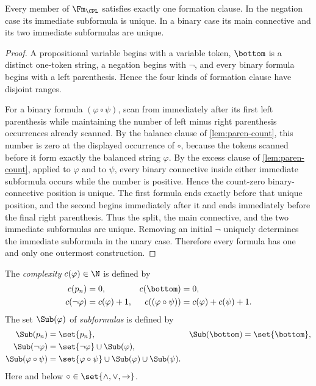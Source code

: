 \begin{theorem}
\label{thm:prop-unique-readability}
Every member of \(\Fm_{\CPL}\) satisfies exactly one formation clause.  In
the negation case its immediate subformula is unique.  In a binary case its
main connective and its two immediate subformulas are unique.
\end{theorem}
\begin{proof}
A propositional variable begins with a variable token, \(\bottom\) is a
distinct one-token string, a negation begins with \(\neg\), and every binary
formula begins with a left parenthesis.  Hence the four kinds of formation
clause have disjoint ranges.

For a binary formula \((\varphi\circ\psi)\), scan from immediately after
its first left parenthesis while maintaining the number of left minus right
parenthesis occurrences already scanned.  By the balance clause of
\cref{lem:paren-count}, this number is zero at the displayed occurrence of
\(\circ\), because the tokens scanned before it form exactly the balanced
string \(\varphi\).  By the excess clause of \cref{lem:paren-count},
applied to \(\varphi\) and to \(\psi\), every binary connective inside
either immediate subformula occurs while the number is positive.  Hence the
count-zero binary-connective position is unique.  The first formula ends
exactly before that unique position, and the second begins immediately after
it and ends immediately before the final right parenthesis.  Thus the split, the
main connective, and the two immediate subformulas are unique.  Removing an
initial \(\neg\) uniquely determines the immediate subformula in the unary
case.  Therefore every formula has one and only one outermost construction.
\end{proof}

\begin{definition}
The \emph{complexity} \(c(\varphi)\in\N\) is defined by
\[
\begin{aligned}
 c(p_n)&=0,&c(\bottom)&=0,\\
 c(\neg\varphi)&=c(\varphi)+1,
 &c((\varphi\circ\psi))&=c(\varphi)+c(\psi)+1.
\end{aligned}
\]
The set \(\Sub(\varphi)\) of \emph{subformulas} is defined by
\[
\begin{aligned}
 \Sub(p_n)&=\set{p_n},&\Sub(\bottom)&=\set{\bottom},\\
 \Sub(\neg\varphi)&=\set{\neg\varphi}\cup\Sub(\varphi),\\
 \Sub(\varphi\circ\psi)&=
 \set{\varphi\circ\psi}\cup\Sub(\varphi)\cup\Sub(\psi).
\end{aligned}
\]
Here and below \(\circ\in\set{\land,\lor,\to}\).
\end{definition}

